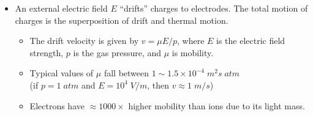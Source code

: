 \begin{itemize}
\begin{itemize}
    \end{itemize}
    \item An external electric field $E$ ``drifts'' charges to electrodes. The total motion of charges is the superposition of drift and thermal motion.
    \begin{itemize}
        \item The drift velocity is given by $v=\mu E/p$, where $E$ is the electric field strength, $p$ is the gas pressure, and $\mu$ is mobility.
        \item Typical values of $\mu$ fall between $1\sim1.5\times10^{-4}\;m^2s\;atm$\\
        (if $p=1\;atm$ and $E=10^4\;V/m$, then $v\approx1\;m/s$)
        \item Electrons have $\approx1000\times$ higher mobility than ions due to its light mass.
    \end{itemize}
\end{itemize}
